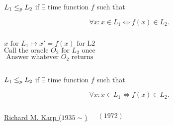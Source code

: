 \begin{frame}
  \begin{definition}
	\begin{center}
	  $L_1 \le_{p} L_2$ if $\exists$  time function $f$ such that
	\end{center}
	\[
	  \forall x: x \in L_1 \iff f(x) \in L_2.
	\]
  \end{definition}

  \begin{columns}
	  \begin{center}
		\pause
		\[
		  x \text{ for } L_1 \mapsto x' = f(x) \text{ for L2}
		\]
		\pause
		\[
		  \text{Call the oracle } O_2 \text{ for } L_2 \text{ once}
		\]
		\pause
		\[
		  \text{Answer whatever } O_2 \text{ returns}
		\]
	  \end{center}
	  \pause
  \end{columns}
\end{frame}

\begin{frame}
  \begin{definition}
	\begin{center}
	  $L_1 \le_{p} L_2$ if $\exists$  time function $f$ such that
	\end{center}
	\[
	  \forall x: x \in L_1 \iff f(x) \in L_2.
	\]
  \end{definition}

  \pause
  \begin{center}
  \end{center}

  \pause
  \begin{columns}
	  \begin{center}
		\href{https://en.wikipedia.org/wiki/Richard\_M.\_Karp}{Richard M. Karp ($1935 \sim$)}
	  \end{center}
	  \begin{center}
		\href{https://people.eecs.berkeley.edu/~luca/cs172/karp.pdf}{$(1972)$}
	  \end{center}
  \end{columns}
\end{frame}

